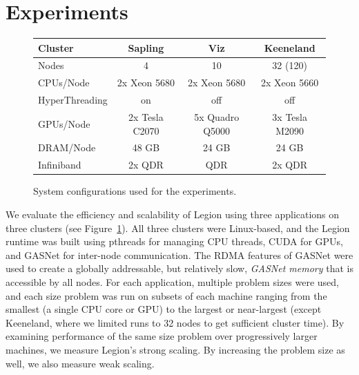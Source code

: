 \section{Experiments}
\label{sec:exp}



\begin{figure}
{\footnotesize
\begin{tabular*}{3.5in}{l|ccc}
Cluster & Sapling & Viz & Keeneland \\
\midrule
Nodes   &   4     &  10 &  32 (120) \\
CPUs/Node & 2x Xeon 5680 & 2x Xeon 5680 & 2x Xeon 5660 \\
HyperThreading & on & off & off \\
GPUs/Node & 2x Tesla C2070 & 5x Quadro Q5000 & 3x Tesla M2090 \\
DRAM/Node & 48 GB & 24 GB & 24 GB \\
Infiniband & 2x QDR & QDR & 2x QDR \\
\end{tabular*}
}
\vspace{-2mm}
\caption{System configurations used for the experiments. \label{fig:systems}}
\vspace{-6mm}
\end{figure}

%
%
%  


We evaluate the efficiency and scalability of Legion using
three applications on three clusters (see Figure~\ref{fig:systems}).  All three
clusters were Linux-based, and the Legion runtime was built using pthreads for
managing CPU threads, CUDA\cite{CUDA} for GPUs, and GASNet\cite{GASNET07} for
inter-node communication.  The RDMA features of GASNet were used to create a 
globally addressable, but relatively slow, {\em GASNet memory} that is accessible
by all nodes.
For each application, multiple problem sizes were used, and each size problem was
run on subsets of each machine ranging from the smallest (a single CPU core or GPU)
to the largest or near-largest (except Keeneland, where we limited
runs to 32 nodes to get sufficient cluster time).
By examining performance of the same size problem over progressively larger
machines, we measure Legion's strong scaling.
By increasing the problem size as well, we also measure weak scaling.

